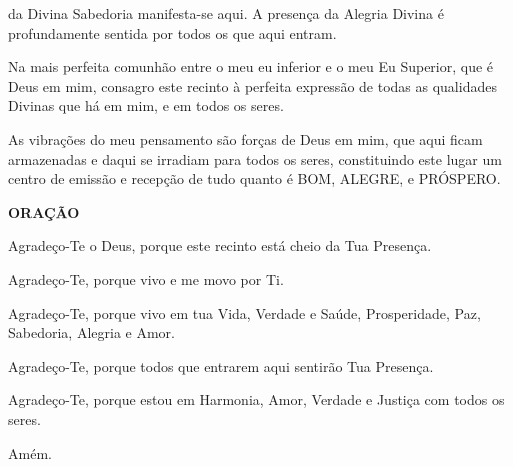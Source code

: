 \begin{passage}[PT]{}
    da Divina Sabedoria manifesta-se aqui. A presença
    da Alegria Divina é profundamente sentida por todos
    os que aqui entram.
    \par
    Na mais perfeita comunhão entre o meu eu inferior
    e o meu Eu Superior, que é Deus em mim, consagro
    este recinto à perfeita expressão de todas as
    qualidades Divinas que há em mim, e em todos os
    seres.
    \par
    As vibrações do meu pensamento são forças de Deus
    em mim, que aqui ficam armazenadas e daqui se
    irradiam para todos os seres, constituindo este
    lugar um centro de emissão e recepção de tudo
    quanto é BOM, ALEGRE, e PRÓSPERO.
    \par
    \vspace{1ex}
    \textbf{ORAÇÃO}
    \par
    Agradeço-Te o Deus, porque este recinto está cheio
    da Tua Presença.
    \par
    Agradeço-Te, porque vivo e me movo por Ti.
    \par
    Agradeço-Te, porque vivo em tua Vida, Verdade e
    Saúde, Prosperidade, Paz, Sabedoria, Alegria e Amor.
    \par
    Agradeço-Te, porque todos que entrarem aqui sentirão
    Tua Presença.
    \par
    Agradeço-Te, porque estou em Harmonia, Amor, Verdade
    e Justiça com todos os seres.
    \par
    Amém.
  \end{passage}
